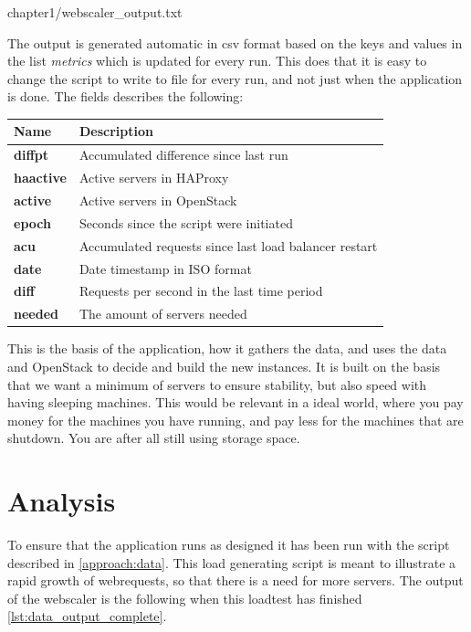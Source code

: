 \begin{center}

{chapter1/webscaler_output.txt}
\end{center}

The output is generated automatic in csv format based on the keys and values in
the list \textit{metrics} which is updated for every run. This does that it is
easy to change the script to write to file for every run, and not just when the
application is done.
The fields describes the following: \\
\begin{table}[h]
\begin{tabular}{ll}
\textbf{Name}   & \textbf{Description}                  \\ \hline
\textbf{diffpt} & Accumulated difference since last run \\
\textbf{haactive} & Active servers in HAProxy \\ 
\textbf{active} & Active servers in OpenStack\\ 
\textbf{epoch} &  Seconds since the script were initiated\\
\textbf{acu} &  Accumulated requests since last load balancer restart\\
\textbf{date} & Date timestamp in ISO format \\
\textbf{diff} & Requests per second in the last time period \\
\textbf{needed} & The amount of servers needed
\end{tabular}
\end{table}

This is the basis of the application, how it gathers the data, and uses the
data and OpenStack to decide and build the new instances. It is built on the
basis that we want a minimum of servers to ensure stability, but also speed
with having sleeping machines. This would be relevant in a ideal world, where
you pay money for the machines you have running, and pay less for the machines
that are shutdown. You are after all still using storage space.

\section{Analysis}
To ensure that the application runs as designed it has been run with the script
described in \ref{approach:data}. This load generating script is meant to
illustrate a rapid growth of webrequests, so that there is a need for more
servers.
The output of the webscaler is the following when this loadtest has finished
\ref{lst:data_output_complete}.

